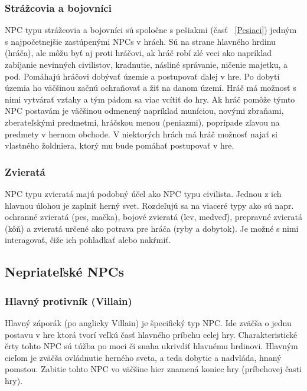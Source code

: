 \documentclass[10pt,twoside,slovak,a4paper]{article}
\begin{document}
\subsubsection{Strážcovia a bojovníci} \label{services}
NPC typu strážcovia a bojovníci sú spoločne s pešiakmi (časť ~\ref{Pesiaci}) jedným s najpočetnejšie zastúpenými NPCs v hrách. Sú na strane hlavného hrdinu (hráča), ale môžu byť aj proti hráčovi, ak hráč robí zlé veci ako napríklad zabíjanie nevinných civilistov, kradnutie, násliné správanie, ničenie majetku, a pod. Pomáhajú hráčovi dobývať územie a postupovať ďalej v hre. Po dobytí územia ho väčšinou začnú ochraňovať a žiť na danom území. Hráč má možnosť s nimi vytvárať vzťahy a tým pádom sa viac vcítiť do hry.  Ak hráč pomôže týmto NPC postavám je väčšinou odmenený napríklad muníciou, novými zbraňami, zberateľskými predmetmi, hráčskou menou (peniazmi), poprípade zľavou na predmety v hernom obchode. V niektorých hrách má hráč možnosť najať si vlastného žoldniera, ktorý mu bude pomáhať postupovať v hre.    

\subsubsection{Zvieratá}
NPC typu zvieratá majú podobný účel ako NPC typu civilista. Jednou z ich hlavnou úlohou je zaplniť herný svet. Rozdeľujú sa na viaceré typy ako sú napr. ochranné zvieratá (pes, mačka), bojové zvieratá (lev, medveď), prepravné zvieratá (kôň) a zvieratá určené ako potrava pre hráča (ryby a dobytok). Je možné s nimi interagovať, čiže ich pohladkať alebo nakŕmiť. 

\subsection{Nepriateľské NPCs} \label{enemy}

\subsubsection{Hlavný protivník (Villain)} \label{Villain}
Hlavný záporák (po anglicky Villain) je špecifický typ NPC. Ide zväčša o jednu postavu v hre ktorá tvorí veľkú časť hlavného príbehu celej hry. Charakteristické črty tohto NPC sú túžba po moci či snaha ukrivdiť hlavnému hrdinovi. Hlavným cieľom je zväčša ovládnutie herného sveta, a teda dobytie a nadvláda, hnaný pomstou. Zabitie tohto NPC vo väčšine hier znamená koniec hry (príbehovej časti hry).
\end{document}
